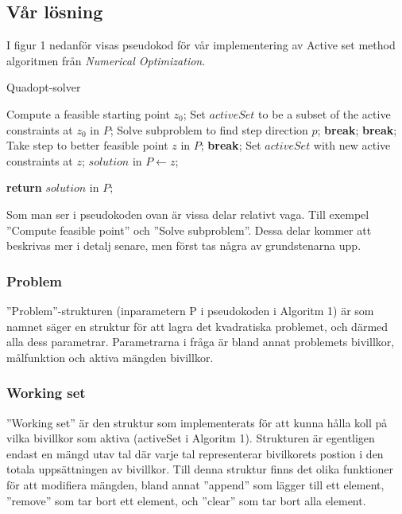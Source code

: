 \subsection{Vår lösning}
I figur 1 nedanför visas pseudokod för vår implementering av Active set method algoritmen från \emph{Numerical Optimization}.

\begin{algorithm}[H]
\caption{Quadopt-solver}
\begin{algorithmic}
	\State Compute a feasible starting point $z_0$;
\EndIf	
\State Set $activeSet$ to be a subset of the active constraints at $z_0$ in $P$;
	\State Solve subproblem to find step direction $p$;
			\State \textbf{break};
		\EndIf		
			\State \textbf{break};
		\EndIf
	\Else
		\State Take step to better feasible point $z$ in $P$;
			\State \textbf{break};
		\EndIf
		\State Set $activeSet$ with new active constraints at $z$;	
	\EndIf
\EndWhile
\State  $solution$ in $P\gets z$;

\State \textbf{return} $solution$ in $P$;
	
\EndProcedure
\end{algorithmic}
\end{algorithm}

Som man ser i pseudokoden ovan är vissa delar relativt vaga. Till exempel ''Compute feasible point'' och ''Solve subproblem''. Dessa delar kommer att beskrivas mer i detalj senare, men först tas några av grundstenarna upp.

\subsubsection{Problem}
''Problem''-strukturen (inparametern P i pseudokoden i Algoritm 1) är som namnet säger en struktur för att lagra det kvadratiska problemet, och därmed alla dess parametrar. Parametrarna i fråga är bland annat problemets bivillkor, målfunktion och aktiva mängden bivillkor.

\subsubsection{Working set}
''Working set'' är den struktur som implementerats för att kunna hålla koll på vilka bivillkor som aktiva (activeSet i Algoritm 1). Strukturen är egentligen endast en mängd utav tal där varje tal representerar bivilkorets postion i den totala uppsättningen av bivillkor. Till denna struktur finns det olika funktioner för att modifiera mängden, bland annat ''append'' som lägger till ett element, ''remove'' som tar bort ett element, och ''clear'' som tar bort alla element.

